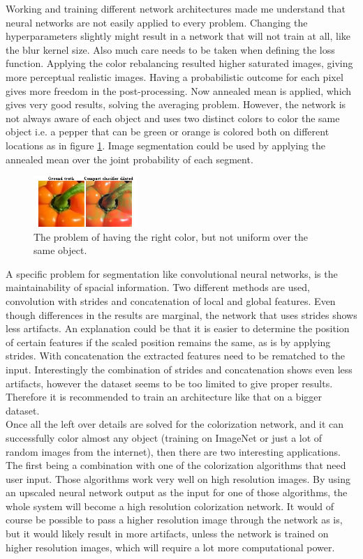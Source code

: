 \documentclass[a4paper]{article}
\begin{document}
\pagestyle{empty}


Working and training different network architectures made me understand that neural networks are not easily applied to every problem. Changing the hyperparameters slightly might result in a network that will not train at all, like the blur kernel size. Also much care needs to be taken when defining the loss function. Applying the color rebalancing resulted higher saturated images, giving more perceptual realistic images. Having a probabilistic outcome for each pixel gives more freedom in the post-processing. Now annealed mean is applied, which gives very good results, solving the averaging problem. However, the network is not always aware of each object and uses two distinct colors to color the same object i.e. a pepper that can be green or orange is colored both on different locations as in figure \ref{fig:color}. Image segmentation could be used by applying the annealed mean over the joint probability of each segment.\\

\begin{figure}[h]
	\centering
	\includegraphics[width=0.35\textwidth]{plaatje}
	\caption{The problem of having the right color, but not uniform over the same object.}
	\label{fig:color}
\end{figure}

A specific problem for segmentation like convolutional neural networks, is the maintainability of spacial information. Two different methods are used, convolution with strides and concatenation of local and global features. Even though differences in the results are marginal, the network that uses strides shows less artifacts. An explanation could be that it is easier to determine the position of certain features if the scaled position remains the same, as is by applying strides. With concatenation the extracted features need to be rematched to the input. Interestingly the combination of strides and concatenation shows even less artifacts, however the dataset seems to be too limited to give proper results. Therefore it is recommended to train an architecture like that on a bigger dataset.  \\

Once all the left over details are solved for the colorization network, and it can successfully color almost any object (training on ImageNet or just a lot of random images from the internet), then there are two interesting applications. The first being a combination with one of the colorization algorithms that need user input. Those algorithms work very well on high resolution images. By using an upscaled neural network output as the input for one of those algorithms, the whole system will become a high resolution colorization network. It would of course be possible to pass a higher resolution image through the network as is, but it would likely result in more artifacts, unless the network is trained on higher resolution images, which will require a lot more computational power.
\end{document}
